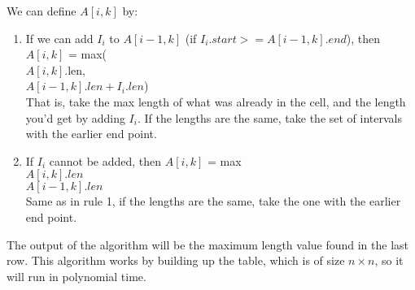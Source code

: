 \documentclass[letterpaper,notitlepage,twoside]{article}
\begin{document}
We can define $A[i, k]$ by:
\begin{enumerate}
\item If we can add $I_i$ to $A[i-1, k]$ (if $I_i.start>=A[i-1,k].end$), then $A[i,k]$ = max(\\
$A[i,k]$.len,\\
$A[i-1, k].len + I_i.len$)\\
That is, take the max length of what was already in the cell, and the length you'd get by adding $I_i$. If the lengths are the same, take the set of intervals with the earlier end point. 
\item If $I_i$ cannot be added, then $A[i, k]$ = max\\
$A[i,k].len$\\
$A[i-1, k].len$\\
Same as in rule 1, if the lengths are the same, take the one with the earlier end point. 
\end{enumerate}
The output of the algorithm will be the maximum length value found in the last row. This algorithm works by building up the table, which is of size $n\times n$, so it will run in polynomial time. 
\end{document}
